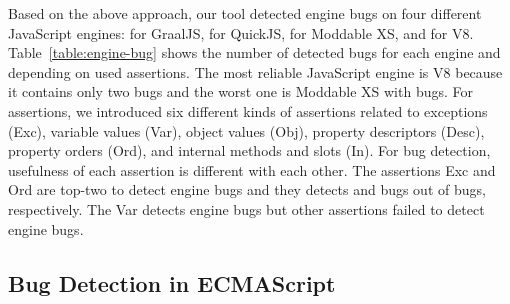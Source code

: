 Based on the above approach, our tool detected  engine bugs on four
different JavaScript engines: \inred{-} for GraalJS, \inred{-} for QuickJS,
\inred{-} for Moddable XS, and \inred{-} for V8.  Table~\ref{table:engine-bug}
shows the number of detected bugs for each engine and depending on used
assertions.  The most reliable JavaScript engine is V8 because it contains only
two bugs and the worst one is Moddable XS with \inred{-} bugs.  For assertions,
we introduced six different kinds of assertions related to exceptions
(\textsf{Exc}), variable values (\textsf{Var}), object values (\textsf{Obj}),
property descriptors (\textsf{Desc}), property orders (\textsf{Ord}), and
internal methods and slots (\textsf{In}).  For bug detection, usefulness of each
assertion is different with each other.  The assertions \textsf{Exc} and
\textsf{Ord} are top-two to detect engine bugs and they detects \inred{-} and
\inred{-} bugs out of  bugs, respectively.  The \textsf{Var} detects
\inred{-} engine bugs but other assertions failed to detect engine bugs.



\subsection{Bug Detection in ECMAScript}

